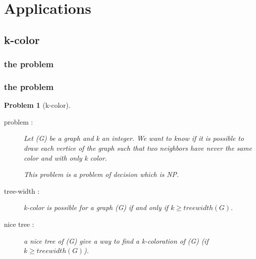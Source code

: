 \documentclass[8pt]{beamer}
\newtheorem*{pb}{Problem}
\begin{document}
\begin{frame}
\begin{columns}
\begin{column}{0.5\textwidth}
\begin{tikzpicture}[yscale=0.85]
      \end{tikzpicture}
    \end{column}
  \end{columns}
  
\end{frame}










\section{Applications}
\subsection{k-color}
\subsubsection{the problem}

\begin{frame}
  \frametitle{ \textcolor{green!50!black}{the problem}}
\begin{pb}[k-color]
  \begin{description}
  \item[problem :] Let (G) be a graph and k an integer. We want to know if it is possible to draw each vertice of the graph such that two neighbors have never the same color and with only k color.

    This problem is a problem of decision which is NP.
  \item[tree-width :] k-color is possible for a graph (G) if and only if $k\geqslant treewidth(G)$.
  \item[nice tree :] a nice tree of (G) give a way to find a k-coloration of (G) (if $k\geqslant treewidth(G)$).
  \end{description}
\end{pb}



\end{frame}
\end{document}
